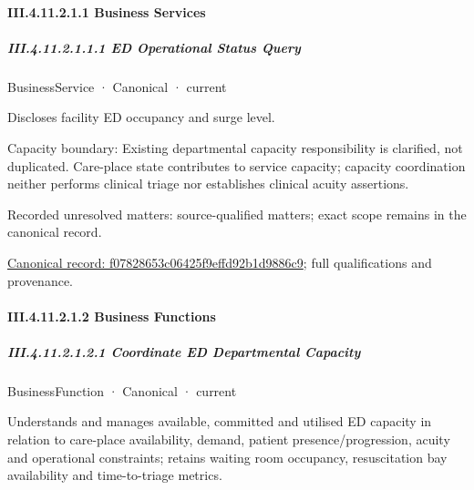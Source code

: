 \paragraph*{III.4.11.2.1.1 Business Services}
\label{navigation:III.4.11.2.1.1}

\subparagraph*{III.4.11.2.1.1.1 ED Operational Status Query}
\label{navigation:III.4.11.2.1.1.1}

\label{element:f07828653c06425f9effd92b1d9886c9}
{\small BusinessService · Canonical · current}\par

Discloses facility ED occupancy and surge level.



Capacity boundary: Existing departmental capacity responsibility is clarified, not duplicated. Care-place state contributes to service capacity; capacity coordination neither performs clinical triage nor establishes clinical acuity assertions.


{\small Recorded unresolved matters: source-qualified matters; exact scope remains in the canonical record.}\par
{\footnotesize \href{../../../../continuum/business/business-service/f07828653c06425f9effd92b1d9886c9.md}{Canonical record: f07828653c06425f9effd92b1d9886c9}; full qualifications and provenance.}\par
\paragraph*{III.4.11.2.1.2 Business Functions}
\label{navigation:III.4.11.2.1.2}

\subparagraph*{III.4.11.2.1.2.1 Coordinate ED Departmental Capacity}
\label{navigation:III.4.11.2.1.2.1}

\label{element:a1559e7ed12c4f249128fba2ff74d536}
{\small BusinessFunction · Canonical · current}\par

Understands and manages available, committed and utilised ED capacity in relation to care-place availability, demand, patient presence/progression, acuity and operational constraints; retains waiting room occupancy, resuscitation bay availability and time-to-triage metrics.



